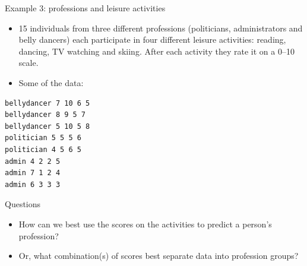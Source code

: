 \documentclass[
  ignorenonframetext,
]{beamer}
\begin{document}
\begin{frame}[fragile]{Example 3: professions and leisure activities}
\protect\hypertarget{example-3-professions-and-leisure-activities}{}

\begin{itemize}
\item
  15 individuals from three different professions (politicians,
  administrators and belly dancers) each participate in four different
  leisure activities: reading, dancing, TV watching and skiing. After
  each activity they rate it on a 0--10 scale.
\item
  Some of the data:
\end{itemize}

\normalsize

\begin{verbatim}
bellydancer 7 10 6 5
bellydancer 8 9 5 7
bellydancer 5 10 5 8
politician 5 5 5 6
politician 4 5 6 5
admin 4 2 2 5
admin 7 1 2 4
admin 6 3 3 3
\end{verbatim}

\normalsize

\end{frame}

\begin{frame}{Questions}
\protect\hypertarget{questions}{}

\begin{itemize}
\item
  How can we best use the scores on the activities to predict a person's
  profession?
\item
  Or, what combination(s) of scores best separate data into profession
  groups?
\end{itemize}

\end{frame}
\end{document}
